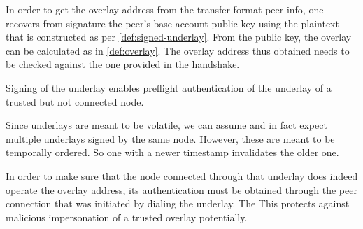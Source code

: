 In order to get the overlay address from the transfer format peer info, one recovers from signature the peer's base account public key using the plaintext that is constructed as per \ref{def:signed-underlay}. From the public key, the overlay can be calculated as in \ref{def:overlay}. The overlay address thus obtained needs to be checked against the one provided in the handshake.

Signing of the underlay enables preflight authentication of the underlay of a trusted but not connected node. 

Since underlays are meant to be volatile, we can assume and in fact expect multiple underlays signed by the same node. However, these are meant to be temporally ordered. So one with a newer timestamp invalidates the older one. 

In order to make sure that the node connected through that underlay does indeed operate the overlay address, its authentication must be obtained through the peer connection that was initiated by dialing the underlay. The This protects against malicious impersonation of a trusted overlay potentially. 